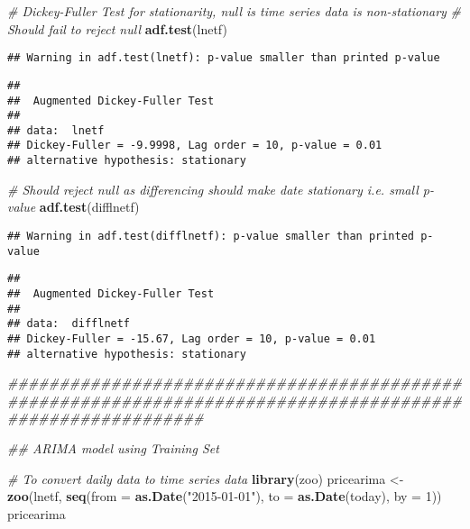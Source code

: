 \documentclass[
]{article}
\newenvironment{Shaded}{\begin{snugshade}}{\end{snugshade}}
\newcommand{\CommentTok}[1]{\textcolor[rgb]{0.56,0.35,0.01}{\textit{#1}}}
\newcommand{\DataTypeTok}[1]{\textcolor[rgb]{0.13,0.29,0.53}{#1}}
\newcommand{\DecValTok}[1]{\textcolor[rgb]{0.00,0.00,0.81}{#1}}
\newcommand{\KeywordTok}[1]{\textcolor[rgb]{0.13,0.29,0.53}{\textbf{#1}}}
\newcommand{\NormalTok}[1]{#1}
\newcommand{\StringTok}[1]{\textcolor[rgb]{0.31,0.60,0.02}{#1}}
\begin{document}
\begin{Shaded}
\begin{Highlighting}[]
  \CommentTok{# Dickey-Fuller Test for stationarity, null is time series data is non-stationary}
    \CommentTok{# Should fail to reject null}
      \KeywordTok{adf.test}\NormalTok{(lnetf)}
\end{Highlighting}
\end{Shaded}

\begin{verbatim}
## Warning in adf.test(lnetf): p-value smaller than printed p-value
\end{verbatim}

\begin{verbatim}
## 
##  Augmented Dickey-Fuller Test
## 
## data:  lnetf
## Dickey-Fuller = -9.9998, Lag order = 10, p-value = 0.01
## alternative hypothesis: stationary
\end{verbatim}

\begin{Shaded}
\begin{Highlighting}[]
    \CommentTok{# Should reject null as differencing should make date stationary i.e. small p-value}
      \KeywordTok{adf.test}\NormalTok{(difflnetf)}
\end{Highlighting}
\end{Shaded}

\begin{verbatim}
## Warning in adf.test(difflnetf): p-value smaller than printed p-value
\end{verbatim}

\begin{verbatim}
## 
##  Augmented Dickey-Fuller Test
## 
## data:  difflnetf
## Dickey-Fuller = -15.67, Lag order = 10, p-value = 0.01
## alternative hypothesis: stationary
\end{verbatim}

\begin{Shaded}
\begin{Highlighting}[]
\CommentTok{###########################################################################################################}
    
\CommentTok{## ARIMA model using Training Set}
      
    \CommentTok{# To convert daily data to time series data}
      \KeywordTok{library}\NormalTok{(zoo)}
\NormalTok{      pricearima <-}\StringTok{ }\KeywordTok{zoo}\NormalTok{(lnetf, }\KeywordTok{seq}\NormalTok{(}\DataTypeTok{from =} \KeywordTok{as.Date}\NormalTok{(}\StringTok{"2015-01-01"}\NormalTok{), }\DataTypeTok{to =} \KeywordTok{as.Date}\NormalTok{(today), }\DataTypeTok{by =} \DecValTok{1}\NormalTok{))}
\NormalTok{      pricearima}
\end{Highlighting}
\end{Shaded}
\end{document}
